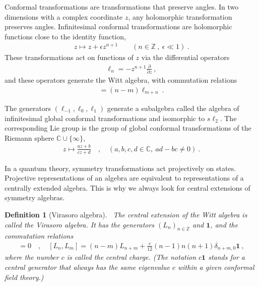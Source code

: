 \documentclass[12pt, a4paper]{article}
\theoremstyle{break}
\newtheorem{defn}[exo]{Definition}
\begin{document}
Conformal transformations are transformations that preserve angles. 
In two dimensions with a complex coordinate $z$, any holomorphic transformation preserves angles.
Infinitesimal conformal transformations are holomorphic functions close to the identity function, 
\begin{align}
 z \mapsto z + \epsilon z^{n+1}\qquad (n\in\mathbb{Z}\ , \ \epsilon\ll 1) \ .
\end{align}
These transformations act on functions of $z$ via the differential operators 
\begin{align}
 \ell_n = -z^{n+1}\frac{\partial}{\partial z}\ ,
\end{align}
and these operators generate the Witt algebra, with commutation relations
\begin{align}
 [\ell_n,\ell_m ] = (n-m)\ell_{m+n}\ .
\end{align}

The generators $(\ell_{-1},\ell_0,\ell_1)$ generate a subalgebra called the algebra of infinitesimal global conformal transformations and isomorphic to $s\ell_2$.  The corresponding Lie group is the group of global conformal transformations of 
the Riemann sphere $\mathbb{C}\cup \{\infty\}$,
\begin{align}
 z \mapsto \frac{az+b}{cz+d}\quad , \quad (a,b,c,d\in \mathbb{C},\ ad-bc\neq 0)\ .
\end{align}

In a quantum theory, symmetry transformations act projectively on states. 
Projective representations of an algebra are equivalent to representations of a centrally extended algebra. 
This is why we always look for central extensions of symmetry algebras.

\begin{defn}[Virasoro algebra]
 ~\label{def:vir}
 The central extension of the Witt algebra is called the Virasoro algebra. It has the generators $(L_n)_{n\in\mathbb{Z}}$ and $\mathbf 1$, and the commutation relations
 \begin{align}
  [\mathbf 1, L_n] = 0 \quad , \quad [L_n,L_m] = (n-m)L_{n+m} +\frac{c}{12}(n-1)n(n+1)\delta_{n+m,0}\mathbf 1 \ ,
  \label{eq:vir}
 \end{align}
 where the number $c$ is called the central charge. (The notation $c\mathbf 1$ stands for a central generator that always has the same eigenvalue $c$ within a given conformal field theory.)
\end{defn}
\end{document}
